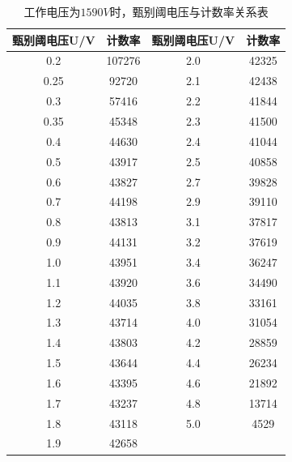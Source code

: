 \documentclass[a4paper,UTF8]{ctexart}
\begin{document}
\begin{table}[H]
    \centering
    \caption{工作电压为$1590V$时，甄别阈电压与计数率关系表}
    \begin{tabular}{|c|c|c|c|}
    \hline
        \textbf{甄别阈电压U/V} & \textbf{计数率} & \textbf{甄别阈电压U/V} & \textbf{计数率} \\ \hline
        0.2 & 107276 & 2.0 & 42325 \\ \hline
        0.25 & 92720 & 2.1 & 42438 \\ \hline
        0.3 & 57416 & 2.2 & 41844 \\ \hline
        0.35 & 45348 & 2.3 & 41500 \\ \hline
        0.4 & 44630 & 2.4 & 41044 \\ \hline
        0.5 & 43917 & 2.5 & 40858 \\ \hline
        0.6 & 43827 & 2.7 & 39828 \\ \hline
        0.7 & 44198 & 2.9 & 39110 \\ \hline
        0.8 & 43813 & 3.1 & 37817 \\ \hline
        0.9 & 44131 & 3.2 & 37619 \\ \hline
        1.0 & 43951 & 3.4 & 36247 \\ \hline
        1.1 & 43920 & 3.6 & 34490 \\ \hline
        1.2 & 44035 & 3.8 & 33161 \\ \hline
        1.3 & 43714 & 4.0 & 31054 \\ \hline
        1.4 & 43803 & 4.2 & 28859 \\ \hline
        1.5 & 43644 & 4.4 & 26234 \\ \hline
        1.6 & 43395 & 4.6 & 21892 \\ \hline
        1.7 & 43237 & 4.8 & 13714 \\ \hline
        1.8 & 43118 & 5.0 & 4529 \\ \hline
        1.9 & 42658 & ~ & ~ \\ \hline
    \end{tabular}
\end{table}
\end{document}
